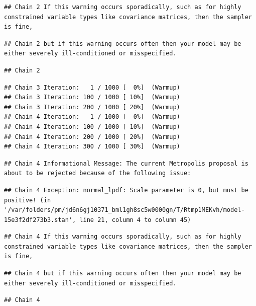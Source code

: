 \documentclass[
]{book}
\begin{document}
\begin{verbatim}
## Chain 2 If this warning occurs sporadically, such as for highly constrained variable types like covariance matrices, then the sampler is fine,
\end{verbatim}

\begin{verbatim}
## Chain 2 but if this warning occurs often then your model may be either severely ill-conditioned or misspecified.
\end{verbatim}

\begin{verbatim}
## Chain 2
\end{verbatim}

\begin{verbatim}
## Chain 3 Iteration:   1 / 1000 [  0%]  (Warmup) 
## Chain 3 Iteration: 100 / 1000 [ 10%]  (Warmup) 
## Chain 3 Iteration: 200 / 1000 [ 20%]  (Warmup) 
## Chain 4 Iteration:   1 / 1000 [  0%]  (Warmup) 
## Chain 4 Iteration: 100 / 1000 [ 10%]  (Warmup) 
## Chain 4 Iteration: 200 / 1000 [ 20%]  (Warmup) 
## Chain 4 Iteration: 300 / 1000 [ 30%]  (Warmup)
\end{verbatim}

\begin{verbatim}
## Chain 4 Informational Message: The current Metropolis proposal is about to be rejected because of the following issue:
\end{verbatim}

\begin{verbatim}
## Chain 4 Exception: normal_lpdf: Scale parameter is 0, but must be positive! (in '/var/folders/pm/jd6n6gj10371_bml1gh8sc5w0000gn/T/Rtmp1MEKvh/model-15e3f2df273b3.stan', line 21, column 4 to column 45)
\end{verbatim}

\begin{verbatim}
## Chain 4 If this warning occurs sporadically, such as for highly constrained variable types like covariance matrices, then the sampler is fine,
\end{verbatim}

\begin{verbatim}
## Chain 4 but if this warning occurs often then your model may be either severely ill-conditioned or misspecified.
\end{verbatim}

\begin{verbatim}
## Chain 4
\end{verbatim}
\end{document}
